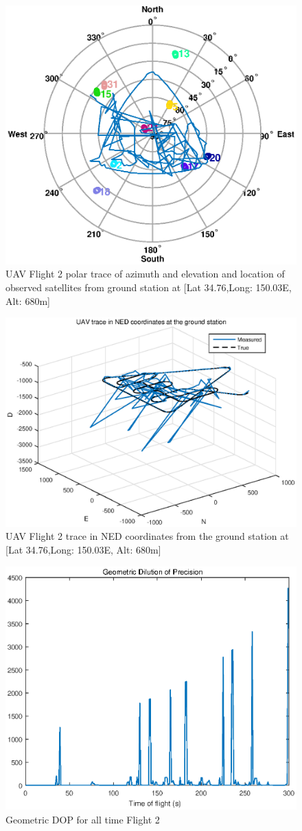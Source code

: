 \documentclass[Space3_Assign2]{subfile}
\begin{document}
\begin{figure}
\centering
\includegraphics[width=0.8\linewidth]{1Cpolar.eps}
\caption{UAV Flight 2 polar trace of azimuth and elevation and location of observed satellites from ground station at [Lat 34.76\Deg,Long: 150.03\Deg E, Alt: 680m]}
\label{fig:1Cpolar}
\end{figure}
\begin{figure}
\centering
\includegraphics[width=0.8\linewidth]{1Ccart.eps}
\caption{UAV Flight 2 trace in NED coordinates from the ground station at [Lat 34.76\Deg,Long: 150.03\Deg E, Alt: 680m]}
\label{fig:1Ccart}
\end{figure}
\begin{figure}
\centering
\includegraphics[width=0.8\linewidth]{1Cgopall.eps}
\caption{Geometric DOP for all time Flight 2}
\label{fig:1Cgopall}
\end{figure}
\end{document}
